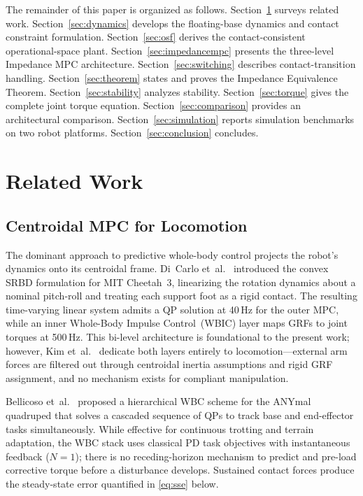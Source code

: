 \documentclass[journal]{IEEEtran}
\begin{document}
The remainder of this paper is organized as follows.
Section~\ref{sec:related} surveys related work.
Section~\ref{sec:dynamics} develops the floating-base dynamics and contact
constraint formulation.
Section~\ref{sec:osf} derives the contact-consistent operational-space
plant.
Section~\ref{sec:impedancempc} presents the three-level Impedance MPC
architecture.
Section~\ref{sec:switching} describes contact-transition handling.
Section~\ref{sec:theorem} states and proves the Impedance Equivalence
Theorem.
Section~\ref{sec:stability} analyzes stability.
Section~\ref{sec:torque} gives the complete joint torque equation.
Section~\ref{sec:comparison} provides an architectural comparison.
Section~\ref{sec:simulation} reports simulation benchmarks on two robot
platforms.
Section~\ref{sec:conclusion} concludes.

\section{Related Work}\label{sec:related}

\subsection{Centroidal MPC for Locomotion}

The dominant approach to predictive whole-body control projects the robot's
dynamics onto its centroidal frame.
Di~Carlo et~al.~\cite{dicarlo2018dynamic} introduced the convex SRBD
formulation for MIT Cheetah~3, linearizing the rotation dynamics about a
nominal pitch-roll and treating each support foot as a rigid contact.
The resulting time-varying linear system admits a QP solution at 40\,Hz for
the outer MPC, while an inner Whole-Body Impulse Control~(WBIC) layer maps
GRFs to joint torques at 500\,Hz.
This bi-level architecture is foundational to the present work; however,
Kim et~al.~\cite{kim2019highly} dedicate both layers entirely to
locomotion---external arm forces are filtered out through centroidal inertia
assumptions and rigid GRF assignment, and no mechanism exists for compliant
manipulation.

Bellicoso et~al.~\cite{bellicoso2016perception} proposed a hierarchical WBC
scheme for the ANYmal quadruped that solves a cascaded sequence of QPs to
track base and end-effector tasks simultaneously.
While effective for continuous trotting and terrain adaptation, the WBC
stack uses classical PD task objectives with instantaneous feedback
($N{=}1$); there is no receding-horizon mechanism to predict and pre-load
corrective torque before a disturbance develops.
Sustained contact forces produce the steady-state error quantified in
\eqref{eq:sse} below.
\end{document}

